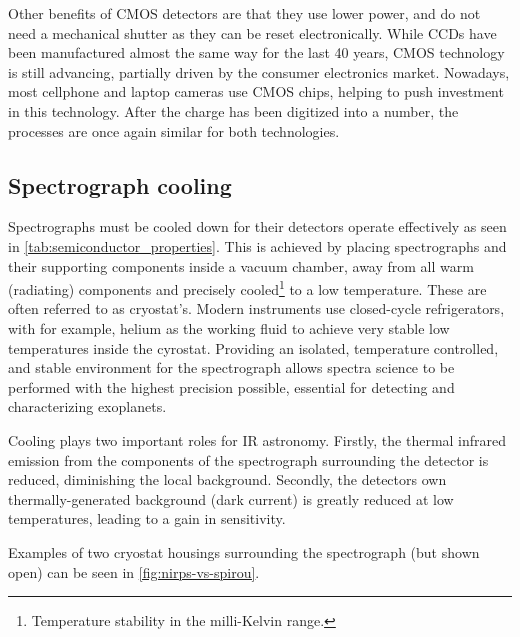 Other benefits of {CMOS} detectors are that they use lower power, and do not need a mechanical shutter as they can be reset electronically.
While {CCDs} have been manufactured almost the same way for the last 40 years, {CMOS} technology is still advancing, partially driven by the consumer electronics market.
Nowadays, most cellphone and laptop cameras use {CMOS} chips, helping to push investment in this technology.
After the charge has been digitized into a number, the processes are once again similar for both technologies.

\subsection{Spectrograph cooling}
\label{subsec:cold_spectrogrpah}
Spectrographs must be cooled down for their detectors operate effectively as seen in \cref{tab:semiconductor_properties}.
This is achieved by placing spectrographs and their supporting components inside a vacuum chamber, away from all warm (radiating) components and precisely cooled\footnote{Temperature stability in the milli-Kelvin range.} to a low temperature.
These are often referred to as cryostat's.
Modern instruments use closed-cycle refrigerators, with for example, helium as the working fluid to achieve very stable low temperatures inside the cyrostat.
Providing an isolated, temperature controlled, and stable environment for the spectrograph allows spectra science to be performed with the highest precision possible, essential for detecting and characterizing exoplanets.

Cooling plays two important roles for {IR} astronomy.
Firstly, the thermal infrared emission from the components of the spectrograph surrounding the detector is reduced, diminishing the local background.
Secondly, the detectors own thermally-generated background (dark current) is greatly reduced at low temperatures, leading to a gain in sensitivity.

Examples of two cryostat housings surrounding the spectrograph (but shown open) can be seen in \cref{fig:nirps-vs-spirou}.

